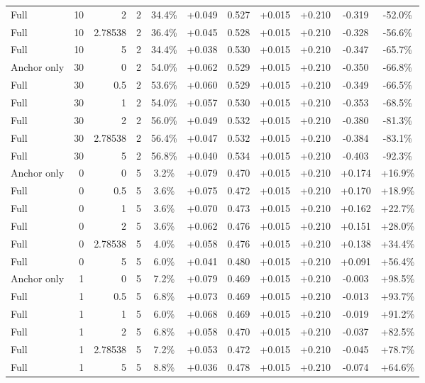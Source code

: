 \begin{table}[htbp]
\begin{tabular}{lrrrccccccc}
Full & 10 & 2 & 2 & 34.4\% & +0.049 & 0.527 & +0.015 & +0.210 & -0.319 & -52.0\% \\
Full & 10 & 2.78538 & 2 & 36.4\% & +0.045 & 0.528 & +0.015 & +0.210 & -0.328 & -56.6\% \\
Full & 10 & 5 & 2 & 34.4\% & +0.038 & 0.530 & +0.015 & +0.210 & -0.347 & -65.7\% \\
Anchor only & 30 & 0 & 2 & 54.0\% & +0.062 & 0.529 & +0.015 & +0.210 & -0.350 & -66.8\% \\
Full & 30 & 0.5 & 2 & 53.6\% & +0.060 & 0.529 & +0.015 & +0.210 & -0.349 & -66.5\% \\
Full & 30 & 1 & 2 & 54.0\% & +0.057 & 0.530 & +0.015 & +0.210 & -0.353 & -68.5\% \\
Full & 30 & 2 & 2 & 56.0\% & +0.049 & 0.532 & +0.015 & +0.210 & -0.380 & -81.3\% \\
Full & 30 & 2.78538 & 2 & 56.4\% & +0.047 & 0.532 & +0.015 & +0.210 & -0.384 & -83.1\% \\
Full & 30 & 5 & 2 & 56.8\% & +0.040 & 0.534 & +0.015 & +0.210 & -0.403 & -92.3\% \\
Anchor only & 0 & 0 & 5 & 3.2\% & +0.079 & 0.470 & +0.015 & +0.210 & +0.174 & +16.9\% \\
Full & 0 & 0.5 & 5 & 3.6\% & +0.075 & 0.472 & +0.015 & +0.210 & +0.170 & +18.9\% \\
Full & 0 & 1 & 5 & 3.6\% & +0.070 & 0.473 & +0.015 & +0.210 & +0.162 & +22.7\% \\
Full & 0 & 2 & 5 & 3.6\% & +0.062 & 0.476 & +0.015 & +0.210 & +0.151 & +28.0\% \\
Full & 0 & 2.78538 & 5 & 4.0\% & +0.058 & 0.476 & +0.015 & +0.210 & +0.138 & +34.4\% \\
Full & 0 & 5 & 5 & 6.0\% & +0.041 & 0.480 & +0.015 & +0.210 & +0.091 & +56.4\% \\
Anchor only & 1 & 0 & 5 & 7.2\% & +0.079 & 0.469 & +0.015 & +0.210 & -0.003 & +98.5\% \\
Full & 1 & 0.5 & 5 & 6.8\% & +0.073 & 0.469 & +0.015 & +0.210 & -0.013 & +93.7\% \\
Full & 1 & 1 & 5 & 6.0\% & +0.068 & 0.469 & +0.015 & +0.210 & -0.019 & +91.2\% \\
Full & 1 & 2 & 5 & 6.8\% & +0.058 & 0.470 & +0.015 & +0.210 & -0.037 & +82.5\% \\
Full & 1 & 2.78538 & 5 & 7.2\% & +0.053 & 0.472 & +0.015 & +0.210 & -0.045 & +78.7\% \\
Full & 1 & 5 & 5 & 8.8\% & +0.036 & 0.478 & +0.015 & +0.210 & -0.074 & +64.6\% \\

\end{tabular}
\end{table}
